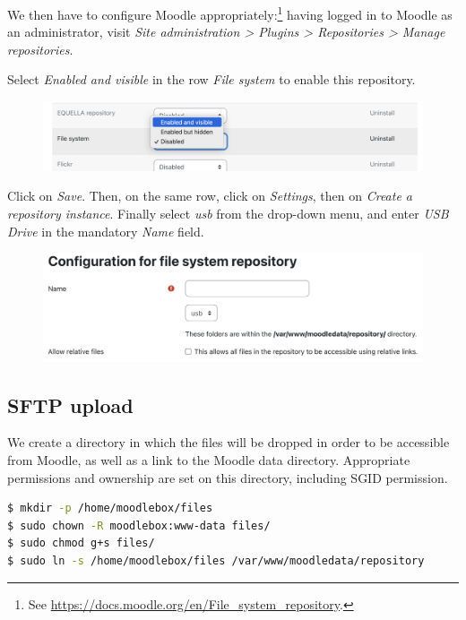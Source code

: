 \documentclass[12pt]{article}
\begin{document}
We then have to configure Moodle appropriately:\footnote{See \url{https://docs.moodle.org/en/File_system_repository}.}
having logged in to Moodle as an administrator, visit \emph{Site administration > Plugins > Repositories > Manage repositories}.

Select \emph{Enabled and visible} in the row \emph{File system} to enable this repository.
\begin{figure}[!ht]
\begin{minipage}[b]{\linewidth}\centering
\includegraphics[width=13cm]{repo-filesystem-usb-1.png}
\end{minipage}
\end{figure}

Click on \emph{Save}.
Then, on the same row, click on \emph{Settings}, then on \emph{Create a repository instance}.
Finally select \emph{usb} from the drop-down menu, and enter \emph{USB Drive} in the mandatory \emph{Name} field.
\begin{figure}[!ht]
\begin{minipage}[b]{\linewidth}\centering
\includegraphics[width=13cm]{repo-filesystem-usb-2.png}
\end{minipage}
\end{figure}

\subsection{SFTP upload}

We create a directory in which the files will be dropped in order to be accessible from Moodle, as well as a link to the Moodle data directory.
Appropriate permissions and ownership are set on this directory, including SGID permission.

\begin{lstlisting}[language=bash]
$ mkdir -p /home/moodlebox/files
$ sudo chown -R moodlebox:www-data files/
$ sudo chmod g+s files/
$ sudo ln -s /home/moodlebox/files /var/www/moodledata/repository
\end{lstlisting}
\end{document}
